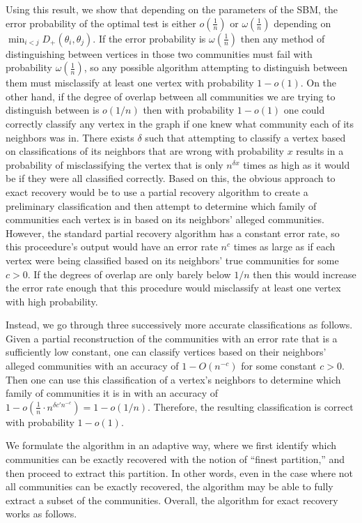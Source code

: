 \documentclass[11pt]{article}
\newcommand{\dd}{D_+}
\newcommand{\1}{\mathbb{1}}
\begin{document}
Using this result, we show that depending on the parameters of the SBM, the error probability of the optimal test is either $o(\frac{1}{n})$ or $\omega(\frac{1}{n})$ depending on $\min_{i<j} \dd(\theta_i,\theta_j)$. If the error probability is $\omega(\frac{1}{n})$ then any method of distinguishing between vertices in those two communities must fail with probability $\omega(\frac{1}{n})$, so any possible algorithm attempting to distinguish between them must misclassify at least one vertex with probability $1-o(1)$. On the other hand, if the degree of overlap between all communities we are trying to distinguish between is $o(1/n)$ then with probability $1-o(1)$ one could correctly classify any vertex in the graph if one knew what community each of its neighbors was in. There exists $\delta$ such that attempting to classify a vertex based on classifications of its neighbors that are wrong with probability $x$ results in a probability of misclassifying the vertex that is only $n^{\delta x}$ times as high as it would be if they were all classified correctly. Based on this, the obvious approach to exact recovery would be to use a partial recovery algorithm to create a preliminary classification and then attempt to determine which family of communities each vertex is in based on its neighbors' alleged communities. However, the standard partial recovery algorithm has a constant error rate, so this proceedure's output would have an error rate $n^c$ times as large as if each vertex were being classified based on its neighbors' true communities for some $c>0$. If the degrees of overlap are only barely below $1/n$ then this would increase the error rate enough that this procedure  would misclassify at least one vertex with high probability.

Instead, we go through three successively more accurate classifications as follows. Given a partial reconstruction of the communities with an error rate that is a sufficiently low constant, one can classify vertices based on their neighbors' alleged communities with an accuracy of $1-O(n^{-c})$ for some constant $c>0$. Then one can use this classification of a vertex's neighbors to determine which family of communities it is in with an accuracy of $1-o(\frac{1}{n}\cdot n^{\delta c'n^{-c}})=1-o(1/n)$. Therefore, the resulting classification is correct with probability $1-o(1)$. 

We formulate the algorithm in an adaptive way, where we first identify which communities can be exactly recovered with the notion of ``finest partition,'' and then proceed to extract this partition. In other words, even in the case where not all communities can be exactly recovered, the algorithm may be able to fully extract a subset of the communities. Overall, the algorithm for exact recovery works as follows.\\
\end{document}
